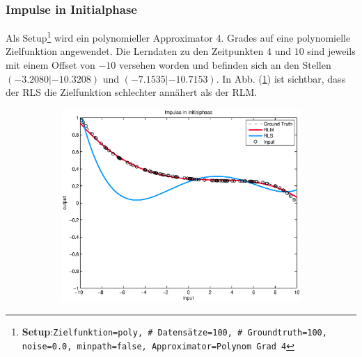 \documentclass[a4paper, 12pt]{article}
\begin{document}
{\subsubsection{Impulse in Initialphase}
\label{sec:perf:impulse:intial}
Als Setup\footnote{\textbf{Setup}:\quad\texttt{Zielfunktion=poly, \# Datensätze=100, \# Groundtruth=100, noise=0.0, minpath=false, Approximator=Polynom Grad 4}} wird ein polynomieller Approximator 4. Grades auf eine polynomielle Zielfunktion angewendet. Die Lerndaten zu den Zeitpunkten $4$ und $10$ sind jeweils mit einem Offset von $-10$ versehen worden und befinden sich an den Stellen $(-3.2080|-10.3208)$ und $(-7.1535|-10.7153)$. 
In Abb. (\ref{fig:perf:impinit:approx}) ist sichtbar, dass der RLS die Zielfunktion schlechter annähert als der RLM.
\begin{figure}[H]
        \centering
        \begin{subfigure}[b]{0.4\textwidth}
                \centering
                \includegraphics[width=\textwidth]{./images/copyofstats/impsuperinit(dev5)_approx_100.eps}
                \caption{}
                \label{fig:perf:impinit:approx}
        \end{subfigure}
        \begin{subfigure}[b]{0.4\textwidth}
                \centering

\end{subfigure}
\end{figure}}
\end{document}
